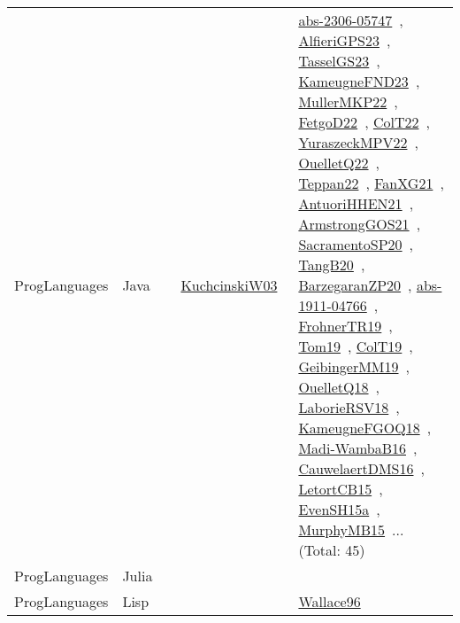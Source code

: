 {\begin{longtable}{lp{3cm}>{\raggedright\arraybackslash}p{6cm}>{\raggedright\arraybackslash}p{6cm}>{\raggedright\arraybackslash}p{8cm}}
ProgLanguages & Java &  & \href{articles/KuchcinskiW03.pdf}{KuchcinskiW03}~\cite{KuchcinskiW03} & \href{articles/abs-2306-05747.pdf}{abs-2306-05747}~\cite{abs-2306-05747}, \href{articles/AlfieriGPS23.pdf}{AlfieriGPS23}~\cite{AlfieriGPS23}, \href{papers/TasselGS23.pdf}{TasselGS23}~\cite{TasselGS23}, \href{papers/KameugneFND23.pdf}{KameugneFND23}~\cite{KameugneFND23}, \href{articles/MullerMKP22.pdf}{MullerMKP22}~\cite{MullerMKP22}, \href{articles/FetgoD22.pdf}{FetgoD22}~\cite{FetgoD22}, \href{articles/ColT22.pdf}{ColT22}~\cite{ColT22}, \href{articles/YuraszeckMPV22.pdf}{YuraszeckMPV22}~\cite{YuraszeckMPV22}, \href{papers/OuelletQ22.pdf}{OuelletQ22}~\cite{OuelletQ22}, \href{papers/Teppan22.pdf}{Teppan22}~\cite{Teppan22}, \href{articles/FanXG21.pdf}{FanXG21}~\cite{FanXG21}, \href{papers/AntuoriHHEN21.pdf}{AntuoriHHEN21}~\cite{AntuoriHHEN21}, \href{papers/ArmstrongGOS21.pdf}{ArmstrongGOS21}~\cite{ArmstrongGOS21}, \href{articles/SacramentoSP20.pdf}{SacramentoSP20}~\cite{SacramentoSP20}, \href{papers/TangB20.pdf}{TangB20}~\cite{TangB20}, \href{papers/BarzegaranZP20.pdf}{BarzegaranZP20}~\cite{BarzegaranZP20}, \href{articles/abs-1911-04766.pdf}{abs-1911-04766}~\cite{abs-1911-04766}, \href{papers/FrohnerTR19.pdf}{FrohnerTR19}~\cite{FrohnerTR19}, \href{papers/Tom19.pdf}{Tom19}~\cite{Tom19}, \href{papers/ColT19.pdf}{ColT19}~\cite{ColT19}, \href{papers/GeibingerMM19.pdf}{GeibingerMM19}~\cite{GeibingerMM19}, \href{papers/OuelletQ18.pdf}{OuelletQ18}~\cite{OuelletQ18}, \href{articles/LaborieRSV18.pdf}{LaborieRSV18}~\cite{LaborieRSV18}, \href{papers/KameugneFGOQ18.pdf}{KameugneFGOQ18}~\cite{KameugneFGOQ18}, \href{papers/Madi-WambaB16.pdf}{Madi-WambaB16}~\cite{Madi-WambaB16}, \href{papers/CauwelaertDMS16.pdf}{CauwelaertDMS16}~\cite{CauwelaertDMS16}, \href{articles/LetortCB15.pdf}{LetortCB15}~\cite{LetortCB15}, \href{articles/EvenSH15a.pdf}{EvenSH15a}~\cite{EvenSH15a}, \href{papers/MurphyMB15.pdf}{MurphyMB15}~\cite{MurphyMB15}... (Total: 45)\\
ProgLanguages & Julia &  &  & \\
ProgLanguages & Lisp &  &  & \href{articles/Wallace96.pdf}{Wallace96}~\cite{Wallace96}\\

\end{longtable}}
